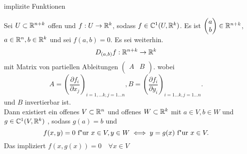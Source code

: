 \documentclass[class=article, crop=false]{standalone}
\begin{document}
\begin{zettel}{implizite Funktionen}
\begin{theorem}
	\begin{flashcard}[j0p2atct]{}
		Sei $U \subset \mathbb{R}^{n + k } $ offen und $f: U \to  \mathbb{R}^k $, sodass $f \in  \mathbb{C}^1 (U, \mathbb{R} ^k)$. Es ist
		$\begin{pmatrix}
				a \\
				b \\
			\end{pmatrix} \in  \mathbb{R}^{n + k }$, $a \in  \mathbb{R}^n, b \in  \mathbb{R}^k$ und sei $f (a,b ) = 0$. Es sei weiterhin.
		\[
			D_{(a,b)} f : \mathbb{R}^{n +k} \to \mathbb{R} ^k
		\]
		mit Matrix von partiellen Ableitungen $ \begin{pmatrix} A & B \\ \end{pmatrix}$.
		wobei
		\[
			A = \left(\frac{\partial f_i}{\partial x_j} \right)_{i = 1, \dots k , j = 1 \dots n }, B = \left(\frac{\partial f_i}{\partial y_i} \right)_{i = 1 \dots k , j = 1 \dots n }
		.\]
		und $B$ invertierbar ist.\\
		Dann existiert ein offenes $V \subset  \mathbb{R}^n$  und offenes $W \subset  \mathbb{R}^k$ mit $a \in  V, b \in  W $ und $g \in  \mathbb{C}^1 (V,\mathbb{R}^k )$ , sodass $g(a)= b $ und
		\[
			f (x,y ) = 0 \text{ f"ur } x \in  V, y \in  W \iff y = g(x) \text{ f"ur } x \in  V
		.\]
		Das impliziert $f (x,g(x) ) = 0 \quad \forall  x \in  V$
	\end{flashcard}
\end{theorem}
\end{zettel}
\end{document}
